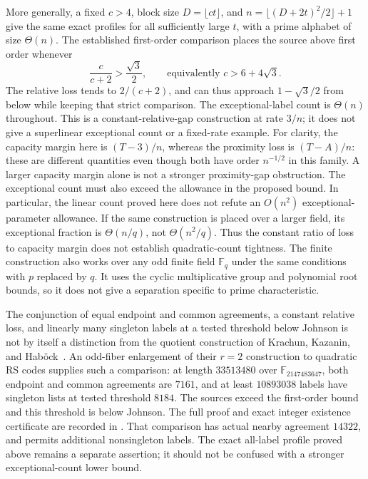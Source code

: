 More generally, a fixed $c>4$, block size $D=\lfloor ct\rfloor$,
and $n=\lfloor(D+2t)^2/2\rfloor+1$ give the same exact profiles
for all sufficiently large $t$, with a prime alphabet of size
$\Theta(n)$.  The established first-order comparison places the
source above first order whenever
\[
 \frac{c}{c+2}>\frac{\sqrt3}{2},
 \qquad\text{equivalently }c>6+4\sqrt3.
\]
The relative loss tends to $2/(c+2)$, and can thus approach
$1-\sqrt3/2$ from below while keeping that strict comparison.
The exceptional-label count is $\Theta(n)$ throughout.  This is
a constant-relative-gap construction at rate $3/n$; it does not
give a superlinear exceptional count or a fixed-rate example.
For clarity, the capacity margin here is $(T-3)/n$, whereas the
proximity loss is $(T-A)/n$: these are different quantities even
though both have order $n^{-1/2}$ in this family.  A larger capacity
margin alone is not a stronger proximity-gap obstruction.  The
exceptional count must also exceed the allowance in the proposed
bound.  In particular, the linear count proved here does not refute
an $O(n^2)$ exceptional-parameter allowance.  If the same construction
is placed over a larger field, its exceptional fraction is
$\Theta(n/q)$, not $\Theta(n^2/q)$.  Thus the constant ratio of loss
to capacity margin does not establish quadratic-count tightness.
The finite construction also works over any odd finite field
$\mathbb F_q$ under the same conditions with $p$ replaced by $q$.
It uses the cyclic multiplicative group and polynomial root bounds,
so it does not give a separation specific to prime characteristic.

The conjunction of equal endpoint and common agreements, a constant
relative loss, and linearly many singleton labels at a tested threshold
below Johnson is not by itself a distinction from the quotient
construction of Krachun, Kazanin, and Hab\"ock~\cite{kkh}.
An odd-fiber enlargement of their $r=2$ construction to quadratic RS
codes supplies such a comparison: at length $33513480$ over
$\mathbb F_{2147483647}$, both endpoint and common agreements are
$7161$, and at least $10893038$ labels have singleton lists at tested
threshold $8184$.  The sources exceed the first-order bound and this
threshold is below Johnson.  The full proof and exact integer
existence certificate are recorded in
.
That comparison has actual nearby agreement $14322$, and permits
additional nonsingleton labels.  The exact all-label profile proved
above remains a separate assertion; it should not be confused with
a stronger exceptional-count lower bound.

